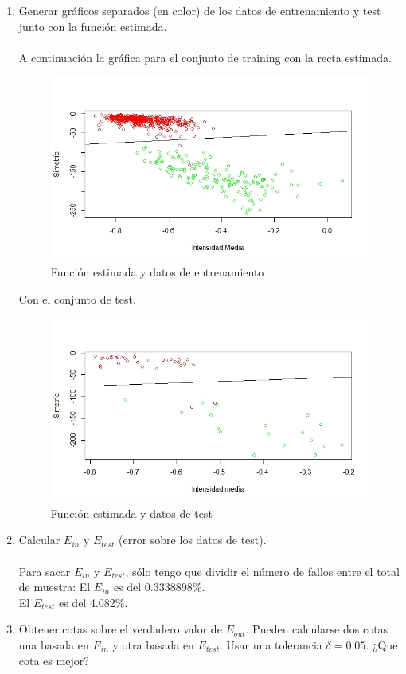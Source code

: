 	\begin{enumerate}
		\item Generar gráficos separados (en color) de los datos de entrenamiento y test junto con la función estimada.
		\\
		\\
		A continuación la gráfica para el conjunto de training con la recta estimada.
		\begin{figure} [H]
		\centering
		\includegraphics[width=1.0\linewidth]{captura9}
		\caption{Función estimada y datos de entrenamiento}
		\label{fig:captura9}
		\end{figure}
		
		Con el conjunto de test.
		\begin{figure} [H]
		\centering
		\includegraphics[width=1.0\linewidth]{captura10}
		\caption{Función estimada y datos de test}
		\label{fig:captura10}
		\end{figure}

		
		
		\item Calcular $E_{in}$ y $E_{test}$ (error sobre los datos de test).
		\\
		\\
		Para sacar $E_{in}$ y $E_{test}$, sólo tengo que dividir el número de fallos entre el total de muestra:
		El $E_{in}$ es del 0.3338898\%.
		\\
		El $E_{test}$ es del 4.082\%.
		\item Obtener cotas sobre el verdadero valor de $E_{out}$. Pueden calcularse dos cotas una basada en $E_{in}$ y otra basada en $E_{test}$. Usar una tolerancia $\delta=0.05$. ¿Que cota es mejor?
		\\
		\\
		

\end{enumerate}
